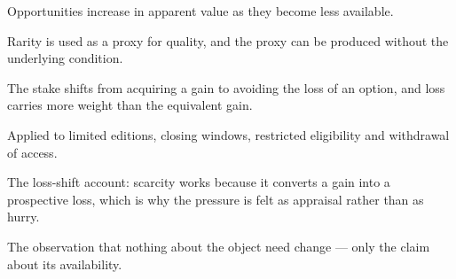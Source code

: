 

\begin{distilled}
  \item Opportunities increase in apparent value as they become less available.
  \item Rarity is used as a proxy for quality, and the proxy can be produced without the underlying condition.
  \item The stake shifts from acquiring a gain to avoiding the loss of an option, and loss carries more weight than the equivalent gain.
  \item Applied to limited editions, closing windows, restricted eligibility and withdrawal of access.
\end{distilled}

\begin{unique}
  \item The loss-shift account: scarcity works because it converts a gain into a prospective loss, which is why the pressure is felt as appraisal rather than as hurry.
  \item The observation that nothing about the object need change --- only the claim about its availability.
\end{unique}
